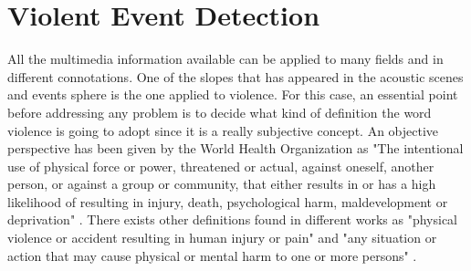 \section{Violent Event Detection}

	All the multimedia information available can be applied to many fields and in different connotations. One of the slopes that has appeared in the acoustic scenes and events sphere is the one applied to violence. For this case, an essential point before addressing any problem is to decide what kind of definition the word violence is going to adopt since it is a really subjective concept. An objective perspective has been given by the World Health Organization as "The  intentional  use  of physical  force  or  power,  threatened  or  actual,  against oneself, another person, or against a group or community, that either results in or has a high likelihood of resulting in injury,  death,  psychological  harm,  maldevelopment  or deprivation" \cite{Krug2002}. There exists other definitions found in different works as "physical violence or accident resulting in human injury or pain" \cite{Demarty2013} and "any situation or action that may cause physical or mental harm to one or more persons" \cite{Giannakopoulos2006}.
	

